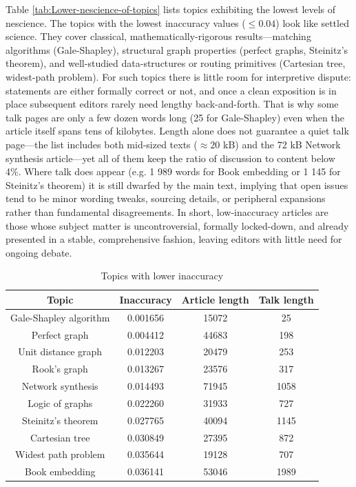 Table \ref{tab:Lower-nescience-of-topics} lists topics exhibiting the lowest levels of nescience. The topics with the lowest inaccuracy values ($\leq 0.04$) look like settled science. They cover classical, mathematically-rigorous results—matching algorithms (Gale-Shapley), structural graph properties (perfect graphs, Steinitz's theorem), and well-studied data-structures or routing primitives (Cartesian tree, widest-path problem). For such topics there is little room for interpretive dispute: statements are either formally correct or not, and once a clean exposition is in place subsequent editors rarely need lengthy back-and-forth. That is why some talk pages are only a few dozen words long (25 for Gale-Shapley) even when the article itself spans tens of kilobytes. Length alone does not guarantee a quiet talk page—the list includes both mid-sized texts ($\approx 20$ kB) and the 72 kB Network synthesis article—yet all of them keep the ratio of discussion to content below 4\%. Where talk does appear (e.g. 1 989 words for Book embedding or 1 145 for Steinitz's theorem) it is still dwarfed by the main text, implying that open issues tend to be minor wording tweaks, sourcing details, or peripheral expansions rather than fundamental disagreements. In short, low-inaccuracy articles are those whose subject matter is uncontroversial, formally locked-down, and already presented in a stable, comprehensive fashion, leaving editors with little need for ongoing debate.

\begin{table}
\begin{centering}
\begin{tabular}{|c|c|c|c|}
\hline 
Topic & Inaccuracy & Article length & Talk length \tabularnewline
\hline 
\hline
Gale-Shapley algorithm & 0.001656 & 15072 & 25 \tabularnewline
\hline
Perfect graph & 0.004412 & 44683 & 198 \tabularnewline
\hline
Unit distance graph & 0.012203 & 20479 & 253 \tabularnewline
\hline
Rook's graph & 0.013267 & 23576 & 317 \tabularnewline
\hline
Network synthesis & 0.014493 & 71945 & 1058 \tabularnewline
\hline
Logic of graphs & 0.022260 & 31933 & 727 \tabularnewline
\hline
Steinitz's theorem & 0.027765 & 40094 & 1145 \tabularnewline
\hline
Cartesian tree & 0.030849 & 27395 & 872 \tabularnewline
\hline
Widest path problem & 0.035644 & 19128 & 707 \tabularnewline
\hline
Book embedding & 0.036141 & 53046 & 1989 \tabularnewline
\hline
\end{tabular}
\par\end{centering}
\caption{\label{tab:Lower-inaccuracy-of-topics}Topics with lower inaccuracy}
\end{table}

